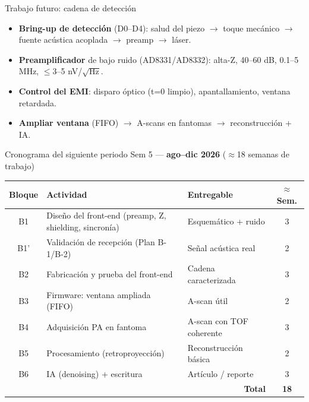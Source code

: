 \documentclass[aspectratio=169,12pt]{beamer}
\begin{document}
\begin{frame}{Trabajo futuro: cadena de detección}
  \begin{itemize}
    \item \textbf{Bring-up de detección} (D0–D4): salud del piezo $\rightarrow$
      toque mecánico $\rightarrow$ fuente acústica acoplada $\rightarrow$ preamp
      $\rightarrow$ láser.
    \item \textbf{Preamplificador} de bajo ruido (AD8331/AD8332): alta-Z, 40–60 dB,
      0.1–5 MHz, $\leq$3–5 nV/$\sqrt{\text{Hz}}$.
    \item \textbf{Control del EMI}: disparo óptico (t=0 limpio), apantallamiento,
      ventana retardada.
    \item \textbf{Ampliar ventana} (FIFO) $\rightarrow$ A-scans en fantomas
      $\rightarrow$ reconstrucción + IA.
  \end{itemize}
\end{frame}

\begin{frame}{Cronograma del siguiente periodo}
\centering
{\footnotesize Sem 5 — \textbf{ago--dic 2026} ($\approx$18 semanas de trabajo)}\\[5pt]
\scriptsize
\begin{tabular}{cllc}
\toprule
\textbf{Bloque} & \textbf{Actividad} & \textbf{Entregable} & \textbf{$\approx$Sem.} \\
\midrule
B1  & Diseño del front-end (preamp, Z, shielding, sincronía) & Esquemático + ruido & 3 \\
B1' & Validación de recepción (Plan B-1/B-2) & Señal acústica real & 2 \\
B2  & Fabricación y prueba del front-end & Cadena caracterizada & 3 \\
B3  & Firmware: ventana ampliada (FIFO) & A-scan útil & 2 \\
B4  & Adquisición PA en fantoma & A-scan con TOF coherente & 3 \\
B5  & Procesamiento (retroproyección) & Reconstrucción básica & 2 \\
B6  & IA (denoising) + escritura & Artículo / reporte & 3 \\
\midrule
\multicolumn{3}{r}{\textbf{Total}} & \textbf{18} \\
\bottomrule
\end{tabular}
\end{frame}
\end{document}
